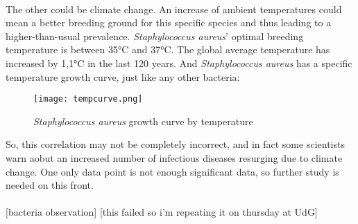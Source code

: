 \paragraph{}The other could be climate change. An increase of ambient temperatures could mean a better breeding ground for this specific species and thus leading to a higher-than-usual prevalence. \emph{Staphylococcus aureus}' optimal breeding temperature is between 35\si{\celsius} and 37\si{\celsius}. The global average temperature has increased by 1,1\si{\celsius}\cite{gmsGMSAnnualGlobal2016} in the last 120 years. And \emph{Staphylococcus aureus} has a specific temperature growth curve, just like any other bacteria:\newline\begin{center}\begin{figure}[H]\texttt{[image: tempcurve.png]}\caption{\emph{Staphylococcus aureus} growth curve by temperature\cite{FigEffectTemperature2022}}\end{figure}\end{center} So, this correlation may not be completely incorrect, and in fact some scientists warn aobut an increased number of infectious diseases resurging due to climate change. One only data point is not enough significant data, so further study is needed on this front.
\paragraph{}[bacteria observation] [this failed so i'm repeating it on thursday at UdG]
